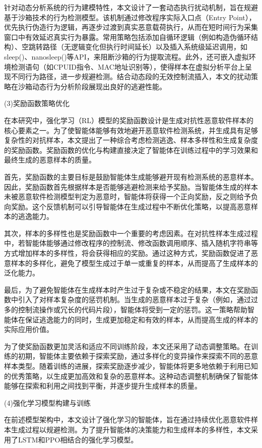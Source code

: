 针对动态分析系统的行为建模特性，本文设计了一套动态执行扰动机制，旨在规避基于沙箱技术的行为检测模型。该机制通过修改程序实际入口点（Entry Point），优先执行伪造行为逻辑，再逐步过渡到真实恶意载荷执行，从而在短时间行为采集窗口中有效延迟真实行为暴露。常用策略包括添加自循环逻辑（例如构造伪循环结构）、空跳转路径（无逻辑变化但执行时间延长）以及插入系统级延迟调用，如sleep()、nanosleep()等API，来阻断沙箱的行为提取流程。此外，还可嵌入虚拟环境检测语句（如CPUID指令、MAC地址识别等），使得样本在虚拟分析平台上呈现不同行为路径，进一步规避检测。结合动态段的无效控制流插入，本文的扰动策略在沙箱动态行为分析阶段展现出良好的逃避性能。

(3)奖励函数策略优化

在本研究中，强化学习（RL）模型的奖励函数设计是生成对抗性恶意软件样本的核心要素之一。为了使智能体能够有效地避开恶意软件检测系统，并生成具有足够复杂性的对抗样本，本文提出了一种综合考虑检测逃逸、样本多样性和生成复杂度的奖励函数。奖励函数的优化与构建直接决定了智能体在训练过程中的学习效果和最终生成的恶意样本的质量。

首先，奖励函数的主要目标是鼓励智能体生成能够避开现有检测系统的恶意样本。因此，奖励函数首先根据样本是否能够逃避检测来给予奖励。当智能体生成的样本未被恶意软件检测模型判定为恶意时，智能体将获得一个正向奖励，反之则给予负向奖励。这个反馈机制可以引导智能体在生成过程中不断优化策略，以提高恶意样本的逃逸能力。

其次，样本的多样性也是奖励函数中一个重要的考虑因素。在对抗性样本生成过程中，若智能体能够通过修改程序的控制流、修改函数调用顺序、插入随机字符串等方式增加样本的多样性，将会获得相应的奖励。通过这种方式，奖励函数促进了恶意样本的多样化，避免了模型生成过于单一或重复的样本，从而提高了生成样本的泛化能力。

最后，为了避免智能体在生成样本时产生过于复杂或不稳定的结果，本文在奖励函数中引入了对样本复杂度的惩罚机制。当生成的恶意样本过于复杂（例如，通过过多的控制流操作或冗长的代码片段），智能体将受到一定的惩罚。这一策略帮助智能体在保证逃逸能力的同时，生成更加稳定和有效的样本，从而提高生成的样本的实际应用价值。

为了使奖励函数更加灵活和适应不同训练阶段，本文还采用了动态调整策略。在训练的初期，智能体主要依赖于探索奖励，通过多样化的变异操作来探索不同的恶意样本类型。随着训练的进展，探索奖励逐步减少，智能体将更多地依赖于利用已知的优秀策略，以生成更加高效和复杂的恶意样本。这种动态调整机制确保了智能体能够在探索和利用之间找到平衡，并逐步提升生成样本的质量。

(4)强化学习模型构建与训练

在前述模型架构中，本文设计了强化学习的智能体，旨在通过持续优化恶意软件样本生成过程以规避检测。为了提升智能体的决策能力和生成样本的多样性，本文采用了LSTM和PPO相结合的强化学习模型。

